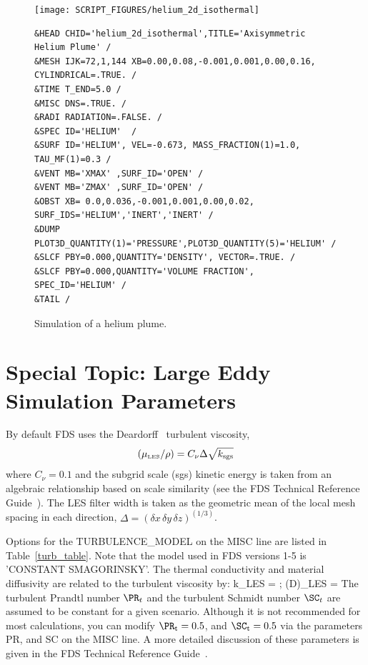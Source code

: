 \documentclass[11pt]{book}
\begin{document}
\begin{figure}[ht]
\noindent
\begin{minipage}{1.1in}
\texttt{[image: SCRIPT\_FIGURES/helium\_2d\_isothermal]}
\end{minipage}
\hfill
\begin{minipage}{5.5in}
\begin{lstlisting}[basicstyle=\scriptsize\ttfamily]
&HEAD CHID='helium_2d_isothermal',TITLE='Axisymmetric Helium Plume' /
&MESH IJK=72,1,144 XB=0.00,0.08,-0.001,0.001,0.00,0.16, CYLINDRICAL=.TRUE. /
&TIME T_END=5.0 /
&MISC DNS=.TRUE. /
&RADI RADIATION=.FALSE. /
&SPEC ID='HELIUM'  /
&SURF ID='HELIUM', VEL=-0.673, MASS_FRACTION(1)=1.0, TAU_MF(1)=0.3 /
&VENT MB='XMAX' ,SURF_ID='OPEN' /
&VENT MB='ZMAX' ,SURF_ID='OPEN' /
&OBST XB= 0.0,0.036,-0.001,0.001,0.00,0.02, SURF_IDS='HELIUM','INERT','INERT' /
&DUMP PLOT3D_QUANTITY(1)='PRESSURE',PLOT3D_QUANTITY(5)='HELIUM' /
&SLCF PBY=0.000,QUANTITY='DENSITY', VECTOR=.TRUE. /
&SLCF PBY=0.000,QUANTITY='VOLUME FRACTION', SPEC_ID='HELIUM' /
&TAIL /
\end{lstlisting}
\end{minipage}
\caption[Snapshot of the {\ct helium\_2d\_isothermal} test case]{Simulation of a helium plume.}
\label{helium_plume}
\end{figure}

\section{Special Topic: Large Eddy Simulation Parameters}
\label{info:LES}

By default FDS uses the Deardorff~\cite{Deardorff:1980,Pope:2000} turbulent viscosity,
\begin{equation}
(\mu_{\hbox{\tiny LES}}/\rho) = C_\nu \Delta \sqrt{k_{\rm sgs}}
\end{equation}
where $C_\nu=0.1$ and the subgrid scale (sgs) kinetic energy is taken from an algebraic relationship based on scale similarity (see the FDS Technical Reference Guide~\cite{FDS_Math_Guide}). The LES filter width is taken as the geometric mean of the local mesh spacing in each direction, $\Delta = (\delta x\, \delta y\, \delta z)^{(1/3)}$.

Options for the {\ct TURBULENCE\_MODEL} on the {\ct MISC} line are listed in Table~\ref{turb_table}. Note that the model used in FDS versions 1-5 is {\ct 'CONSTANT SMAGORINSKY'}. The thermal conductivity and material diffusivity are related to the turbulent viscosity by:
\be
   k_{\hbox{\tiny LES}} = 
   \quad ; \quad  (\rho D)_{\hbox{\tiny LES}} =
\ee
The turbulent Prandtl number $\PR_t$ and the turbulent Schmidt number $\SC_t$ are assumed to be constant for a given scenario. Although it is not recommended for most calculations, you can modify $\PR_{\rm t}=0.5$, and $\SC_{\rm t}=0.5$ via the parameters {\ct PR}, and {\ct SC} on the {\ct MISC} line. A more detailed discussion of these parameters is given in the FDS Technical Reference Guide~\cite{FDS_Math_Guide}.
\end{document}
